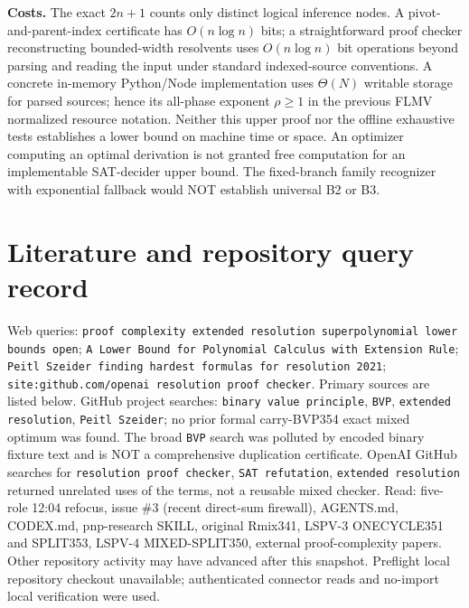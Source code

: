 \documentclass[11pt]{article}
\begin{document}
\par\noindent\textbf{Costs.} The exact $2n+1$ counts only distinct logical inference nodes. A pivot-and-parent-index certificate has $O(n\log n)$ bits; a straightforward proof checker reconstructing bounded-width resolvents uses $O(n\log n)$ bit operations beyond parsing and reading the input under standard indexed-source conventions. A concrete in-memory Python/Node implementation uses $\Theta(N)$ writable storage for parsed sources; hence its all-phase exponent $\rho\ge1$ in the previous FLMV normalized resource notation. Neither this upper proof nor the offline exhaustive tests establishes a lower bound on machine time or space. An optimizer computing an optimal derivation is not granted free computation for an implementable SAT-decider upper bound. The fixed-branch family recognizer with exponential fallback would NOT establish universal B2 or B3.

\section*{Literature and repository query record}
Web queries: \texttt{proof complexity extended resolution superpolynomial lower bounds open}; \texttt{A Lower Bound for Polynomial Calculus with Extension Rule}; \texttt{Peitl Szeider finding hardest formulas for resolution 2021}; \texttt{site:github.com/openai resolution proof checker}. Primary sources are listed below. GitHub project searches: \texttt{binary value principle}, \texttt{BVP}, \texttt{extended resolution}, \texttt{Peitl Szeider}; no prior formal carry-BVP354 exact mixed optimum was found. The broad \texttt{BVP} search was polluted by encoded binary fixture text and is NOT a comprehensive duplication certificate. OpenAI GitHub searches for \texttt{resolution proof checker}, \texttt{SAT refutation}, \texttt{extended resolution} returned unrelated uses of the terms, not a reusable mixed checker. Read: five-role 12:04 refocus, issue \#3 (recent direct-sum firewall), AGENTS.md, CODEX.md, pnp-research SKILL, original Rmix341, LSPV-3 ONECYCLE351 and SPLIT353, LSPV-4 MIXED-SPLIT350, external proof-complexity papers. Other repository activity may have advanced after this snapshot. Preflight local repository checkout unavailable; authenticated connector reads and no-import local verification were used.
\end{document}
